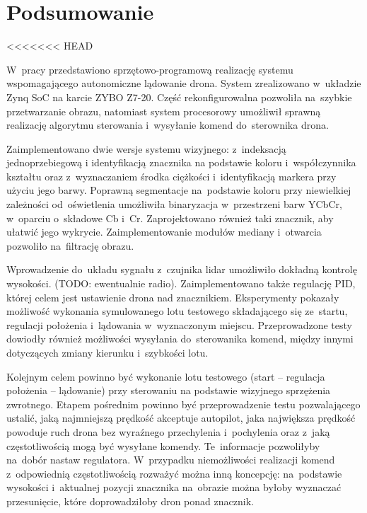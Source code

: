 \chapter{Podsumowanie}
\label{cha:Podsumowanie i kierunki dalszych prac}
<<<<<<< HEAD

W~pracy przedstawiono sprzętowo-programową realizację systemu wspomagającego autonomiczne lądowanie drona.
System zrealizowano w~układzie Zynq SoC na karcie ZYBO Z7-20. 
Część rekonfigurowalna pozwoliła na~szybkie przetwarzanie obrazu, natomiast system procesorowy umożliwił sprawną realizację algorytmu sterowania i~wysyłanie komend do~sterownika drona. 

Zaimplementowano dwie wersje systemu wizyjnego: z~indeksacją jednoprzebiegową i identyfikacją znacznika na podstawie koloru i~współczynnika kształtu oraz z~wyznaczaniem środka ciężkości i~identyfikacją markera przy użyciu jego barwy. 
Poprawną segmentacje na~podstawie koloru przy niewielkiej zależności od~oświetlenia umożliwiła binaryzacja w~przestrzeni barw YCbCr, w~oparciu o~składowe Cb i~Cr. 
Zaprojektowano również taki znacznik, aby ułatwić jego wykrycie. 
Zaimplementowanie modułów mediany i~otwarcia pozwoliło na~filtrację obrazu.

Wprowadzenie do~układu sygnału z~czujnika lidar umożliwiło dokładną kontrolę wysokości. (TODO: ewentualnie radio).
Zaimplementowano także regulację PID, której celem jest ustawienie drona nad znacznikiem. 
Eksperymenty pokazały możliwość wykonania symulowanego lotu testowego składającego się ze~startu, regulacji położenia i~lądowania w~wyznaczonym miejscu.
Przeprowadzone testy dowiodły również możliwości wysyłania do~sterowanika komend, między innymi dotyczących zmiany kierunku i~szybkości lotu. 

Kolejnym celem powinno być wykonanie lotu testowego (start -- regulacja położenia -- lądowanie) przy sterowaniu na podstawie wizyjnego sprzężenia zwrotnego. 
Etapem pośrednim powinno być przeprowadzenie testu pozwalającego ustalić, jaką najmniejszą prędkość akceptuje autopilot, jaka największa prędkość powoduje ruch drona bez wyraźnego przechylenia i~pochylenia oraz z~jaką częstotliwością mogą być wysyłane komendy. 
Te~informacje pozwoliłyby na~dobór nastaw regulatora. 
W~przypadku niemożliwości realizacji komend z~odpowiednią częstotliwością rozważyć można inną koncepcję: na~podstawie wysokości i~aktualnej pozycji znacznika na~obrazie można byłoby wyznaczać przesunięcie, które doprowadziłoby dron ponad znacznik. %

